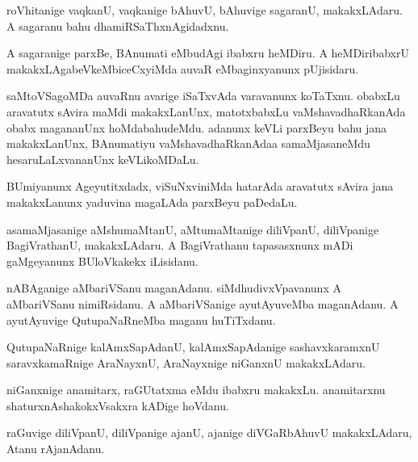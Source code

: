\documentclass{article}
\begin{document}
\begin{mn}
roVhitanige vaqkanU, vaqkanige bAhuvU, bAhuvige sagaranU,
makakxLAdaru. A sagaranu bahu dhamiRSaThxnAgidadxnu.
\end{mn}

\begin{mn}%
A sagaranige parxBe, BAnumati eMbudAgi ibabxru heMDiru. A
heMDiribabxrU makakxLAgabeVkeMbiceCxyiMda auvaR eMbaginxyanunx pUjisidaru.
\end{mn}

\begin{mn}%
saMtoVSagoMDa auvaRnu avarige iSaTxvAda varavanunx koTaTxnu. obabxLu
aravatutx sAvira maMdi makakxLanUnx, matotxbabxLu vaMshavadhaRkanAda
obabx magananUnx hoMdabahudeMdu. adanunx keVLi parxBeyu bahu jana
makakxLanUnx, BAnumatiyu vaMshavadhaRkanAdaa samaMjasaneMdu
hesaruLaLxvananUnx keVLikoMDaLu.
\end{mn}

\begin{mn}
BUmiyanunx Ageyutitxdadx, viSuNxviniMda hatarAda aravatutx sAvira jana
makakxLanunx yaduvina magaLAda parxBeyu paDedaLu.
\end{mn}

\begin{mn}%
asamaMjasanige aMshumaMtanU, aMtumaMtanige diliVpanU, diliVpanige
BagiVrathanU, makakxLAdaru. A BagiVrathanu tapasasxnunx mADi
gaMgeyanunx BUloVkakekx iLisidanu.
\end{mn}

\begin{mn}%
nABAganige aMbariVSanu maganAdanu. siMdhudivxVpavanunx A aMbariVSanu
nimiRsidanu. A aMbariVSanige ayutAyuveMba maganAdanu. A ayutAyuvige
QutupaNaRneMba maganu huTiTxdanu.
\end{mn}

\begin{mn}%
QutupaNaRnige kalAmxSapAdanU, kalAmxSapAdanige sashavxkaramxnU
saravxkamaRnige AraNayxnU, AraNayxnige niGanxnU makakxLAdaru.
\end{mn}

\begin{mn}
niGanxnige anamitarx, raGUtatxma eMdu ibabxru makakxLu. anamitarxnu
shaturxnAshakokxVsakxra kADige hoVdanu.
\end{mn}

\begin{mn}
raGuvige diliVpanU, diliVpanige ajanU, ajanige diVGaRbAhuvU
makakxLAdaru, Atanu rAjanAdanu.
\end{mn}
\end{document}
